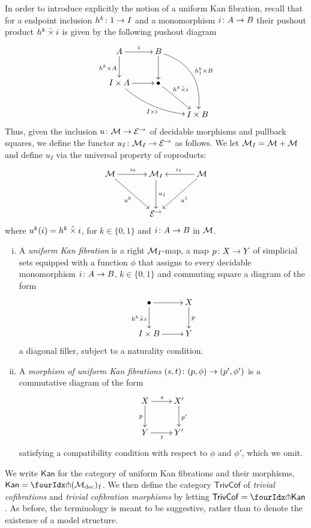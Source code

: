 \documentclass[reqno,10pt,a4paper,oneside]{amsart}
\begin{document}
In order to introduce explicitly the notion of a uniform Kan fibration, recall that for a endpoint inclusion $h^{k} \co 1 \to I$ and  a monomorphism $i \co A \to B$ their pushout product $h^k 
\hattimes i$ is given by the following pushout diagram
\[
\xymatrix{
 A \ar[r]^{i}  \ar[d]_{h^k \times A} &  B \ar@/^2em/[ddr]^{h^k_1 \times B} \ar[d] & \\ 
I \times A \ar@/_1em/[drr]_{I \times i} \ar[r] & \bullet \ar[dr]^-(.35){h^k \hattimes i}  & \\ 
 & & I \times B} 
 \]
 Thus, given the inclusion $u \co \cal{M} \to \cal{E}^\to$ of decidable morphisms and pullback squares, 
 we define the functor $u_{I} \co \cal{M}_{I} \to \cal{E}^\to$ as follows. 
We let $\cal{M}_{I} = \cal{M} + \cal{M}$ and define $u_{I}$ via the universal
 property of coproducts:
  \[
 \xymatrix@R=1.2cm@C=1.2cm{
 \cal{M} \ar[dr]_{u^0}  \ar[r]^{\iota_0} &  \cal{M}_{I} \ar[d]^{u_{I}} & \cal{M} \ar[dl]^{u^1} \ar[l]_{\iota_1} \\
  & \cal{E}^\to & }
  \]
  where $u^k(i) = h^k \hattimes i$,   for $k \in \{ 0, 1 \}$ and $i \co A \to B$ in $\cal{M}$. 


\begin{definition} \hfill 
\begin{enumerate}[(i)] 
\item  A \emph{uniform Kan fibration} is a right $\cal{M}_{I}$-map, \ie 
a map  $p \co X \to Y$ of simplicial sets equipped with a function $\phi$ that assigns
to every decidable monomorphism $i \co A \to B$, $k \in \{0, 1\}$  and commuting
square a diagram of the form
\[
\xymatrix{
\bullet \ar[r] \ar[d]_{h^k \hattimes i} & X \ar[d]^p \\
I \times B \ar[r] & Y }
\]
a diagonal filler, subject to a naturality condition.
 \item A \emph{morphism of uniform Kan fibrations} $(s,t) \co (p, \phi) \to (p', \phi')$ is
 a commutative diagram of the form
 \[
 \xymatrix{
  X \ar[d]_{p} \ar[r]^s & X' \ar[d]^{p'} \\
  Y \ar[r]_{t}& Y' } 
  \]
  satisfying a compatibility condition with respect to $\phi$ and $\phi'$, which we omit. 
 \end{enumerate}
 \end{definition}
 
 We write $\mathsf{Kan}$ for the category of uniform Kan fibrations and their morphisms, \ie 
$\mathsf{Kan} = \liftr{(\cal{M}_{\textup{dec}})_I}$. We then define
the category $\mathsf{TrivCof}$ of \emph{trivial cofibrations} and \emph{trivial cofibration morphisms}
by letting \ie $\mathsf{TrivCof} = \liftl{\mathsf{Kan}}$. As before, the terminology is meant to be
suggestive, rather than to denote the existence of a model structure. 
 
\end{document}
